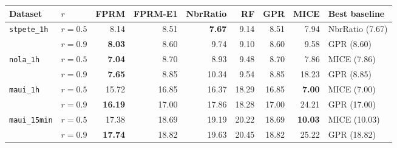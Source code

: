 \begin{tabular}{llrrrrrrl}
\toprule
Dataset & $r$ & FPRM & FPRM-E1 & NbrRatio & RF & GPR & MICE & Best baseline \\
\midrule
\texttt{stpete\_1h} & $r{=}0.5$ & 8.14 & 8.51 & \textbf{7.67} & 9.14 & 8.51 & 7.94 & NbrRatio (7.67) \\
 & $r{=}0.9$ & \textbf{8.03} & 8.60 & 9.74 & 9.10 & 8.60 & 9.58 & GPR (8.60) \\
\midrule
\texttt{nola\_1h} & $r{=}0.5$ & \textbf{7.04} & 8.70 & 8.93 & 9.48 & 8.70 & 7.86 & MICE (7.86) \\
 & $r{=}0.9$ & \textbf{7.65} & 8.85 & 10.34 & 9.54 & 8.85 & 18.23 & GPR (8.85) \\
\midrule
\texttt{maui\_1h} & $r{=}0.5$ & 15.72 & 16.85 & 16.37 & 18.29 & 16.85 & \textbf{7.00} & MICE (7.00) \\
 & $r{=}0.9$ & \textbf{16.19} & 17.00 & 17.86 & 18.28 & 17.00 & 24.21 & GPR (17.00) \\
\midrule
\texttt{maui\_15min} & $r{=}0.5$ & 17.38 & 18.69 & 19.19 & 20.22 & 18.69 & \textbf{10.03} & MICE (10.03) \\
 & $r{=}0.9$ & \textbf{17.74} & 18.82 & 19.63 & 20.45 & 18.82 & 25.22 & GPR (18.82) \\
\bottomrule
\end{tabular}
